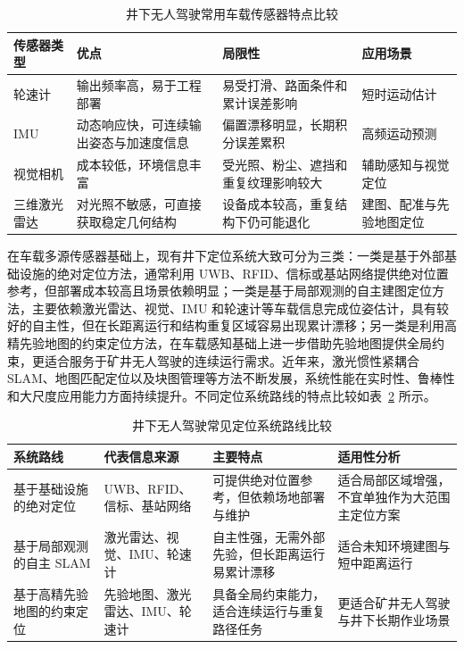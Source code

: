 \begin{table}[htbp]
    \centering
    \caption{井下无人驾驶常用车载传感器特点比较}
    \label{tab:ch1_sensor_compare}
    \small
    \renewcommand{\arraystretch}{1.15}
    \begin{tabular}{p{2.3cm}p{3.2cm}p{3.2cm}p{3.0cm}}
        \toprule
        传感器类型 & 优点 & 局限性 & 应用场景 \\
        \midrule
        轮速计 & 输出频率高，易于工程部署 & 易受打滑、路面条件和累计误差影响 & 短时运动估计 \\
        IMU & 动态响应快，可连续输出姿态与加速度信息 & 偏置漂移明显，长期积分误差累积 & 高频运动预测 \\
        视觉相机 & 成本较低，环境信息丰富 & 受光照、粉尘、遮挡和重复纹理影响较大 & 辅助感知与视觉定位 \\
        三维激光雷达 & 对光照不敏感，可直接获取稳定几何结构 & 设备成本较高，重复结构下仍可能退化 & 建图、配准与先验地图定位 \\
        \bottomrule
    \end{tabular}
\end{table}

在车载多源传感器基础上，现有井下定位系统大致可分为三类：一类是基于外部基础设施的绝对定位方法，通常利用 UWB、RFID、信标或基站网络提供绝对位置参考，但部署成本较高且场景依赖明显；一类是基于局部观测的自主建图定位方法，主要依赖激光雷达、视觉、IMU 和轮速计等车载信息完成位姿估计，具有较好的自主性，但在长距离运行和结构重复区域容易出现累计漂移；另一类是利用高精先验地图的约束定位方法，在车载感知基础上进一步借助先验地图提供全局约束，更适合服务于矿井无人驾驶的连续运行需求。近年来，激光惯性紧耦合 SLAM、地图匹配定位以及块图管理等方法不断发展，系统性能在实时性、鲁棒性和大尺度应用能力方面持续提升\cite{Shan2020LIOSAM,Xu2021FASTLIO2,Feng_2024,Banerjee_2023}。不同定位系统路线的特点比较如表~\ref{tab:ch1_localization_compare} 所示。

\begin{table}[htbp]
    \centering
    \caption{井下无人驾驶常见定位系统路线比较}
    \label{tab:ch1_localization_compare}
    \small
    \renewcommand{\arraystretch}{1.15}
    \begin{tabular}{p{3.2cm}p{2.8cm}p{3.1cm}p{2.9cm}}
        \toprule
        系统路线 & 代表信息来源 & 主要特点 & 适用性分析 \\
        \midrule
        基于基础设施的绝对定位 & UWB、RFID、信标、基站网络 & 可提供绝对位置参考，但依赖场地部署与维护 & 适合局部区域增强，不宜单独作为大范围主定位方案 \\
        基于局部观测的自主 SLAM & 激光雷达、视觉、IMU、轮速计 & 自主性强，无需外部先验，但长距离运行易累计漂移 & 适合未知环境建图与短中距离运行 \\
        基于高精先验地图的约束定位 & 先验地图、激光雷达、IMU、轮速计 & 具备全局约束能力，适合连续运行与重复路径任务 & 更适合矿井无人驾驶与井下长期作业场景 \\
        \bottomrule
    \end{tabular}
\end{table}

